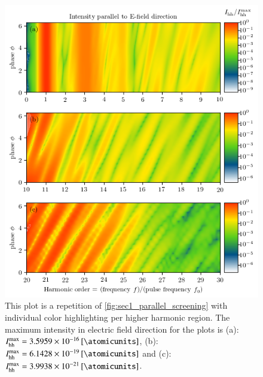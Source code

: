 \documentclass[11pt, a4paper]{scrartcl}
\begin{document}
\begin{figure}[H]
    \centering
    \includegraphics[width=\textwidth]{phase=variable_E_dir_split_plot.png}
    \caption{This plot is a repetition of \cref{fig:sec1_parallel_screening} with individual color
      highlighting per higher harmonic region. The maximum intensity in electric
      field direction for the plots is (a): $I_{\mathrm{hh}}^{\mathrm{max}} = \SI{3.5959e-16}{[\atomicunits]}$, 
      (b): $I_{\mathrm{hh}}^{\mathrm{max}} = \SI{6.1428e-19}{[\atomicunits]}$ and (c): 
      $I_{\mathrm{hh}}^{\mathrm{max}} = \SI{3.9938e-21}{[\atomicunits]}$.}
    \label{fig:sec1_parallel_screening_s}
\end{figure}
\end{document}
